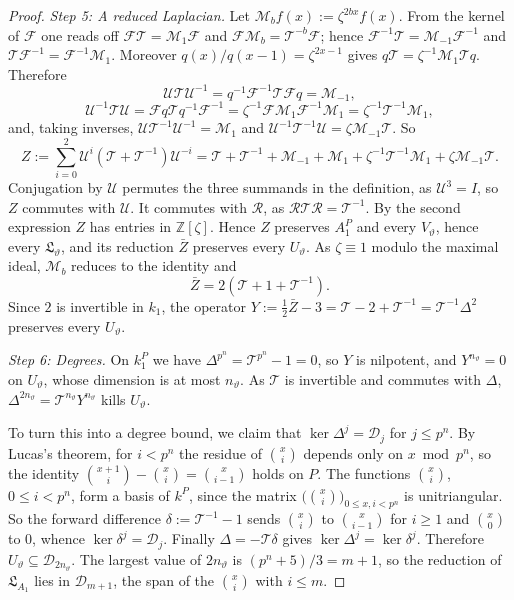 \documentclass[11pt]{amsart}
\numberwithin{equation}{section}
\theoremstyle{plain}
\theoremstyle{definition}
\theoremstyle{remark}
\begin{document}
\begin{proof}
\emph{Step 5: A reduced Laplacian.} Let \(\mathcal M_bf(x):=\zeta^{2bx}f(x)\). From the kernel of \(\mathcal F\) one reads off \(\mathcal F\mathcal T=\mathcal M_1\mathcal F\) and \(\mathcal F\mathcal M_b=\mathcal T^{-b}\mathcal F\); hence \(\mathcal F^{-1}\mathcal T=\mathcal M_{-1}\mathcal F^{-1}\) and \(\mathcal T\mathcal F^{-1}=\mathcal F^{-1}\mathcal M_1\). Moreover \(q(x)/q(x-1)=\zeta^{2x-1}\) gives \(q\mathcal T=\zeta^{-1}\mathcal M_1\mathcal Tq\). Therefore
\[\mathcal U\mathcal T\mathcal U^{-1}=q^{-1}\mathcal F^{-1}\mathcal T\mathcal Fq=\mathcal M_{-1},\]
\[\mathcal U^{-1}\mathcal T\mathcal U=\mathcal Fq\mathcal Tq^{-1}\mathcal F^{-1}=\zeta^{-1}\mathcal F\mathcal M_1\mathcal F^{-1}\mathcal M_1=\zeta^{-1}\mathcal T^{-1}\mathcal M_1,\]
and, taking inverses, \(\mathcal U\mathcal T^{-1}\mathcal U^{-1}=\mathcal M_1\) and \(\mathcal U^{-1}\mathcal T^{-1}\mathcal U=\zeta\mathcal M_{-1}\mathcal T\). So
\[Z:=\sum_{i=0}^{2}\mathcal U^i(\mathcal T+\mathcal T^{-1})\mathcal U^{-i}=\mathcal T+\mathcal T^{-1}+\mathcal M_{-1}+\mathcal M_1+\zeta^{-1}\mathcal T^{-1}\mathcal M_1+\zeta\mathcal M_{-1}\mathcal T .\]
Conjugation by \(\mathcal U\) permutes the three summands in the definition, as \(\mathcal U^3=I\), so \(Z\) commutes with \(\mathcal U\). It commutes with \(\mathcal R\), as \(\mathcal R\mathcal T\mathcal R=\mathcal T^{-1}\). By the second expression \(Z\) has entries in \(\mathbb Z[\zeta]\). Hence \(Z\) preserves \(A_1^P\) and every \(V_\vartheta\), hence every \(\mathfrak L_\vartheta\), and its reduction \(\bar Z\) preserves every \(U_\vartheta\). As \(\zeta\equiv1\) modulo the maximal ideal, \(\mathcal M_b\) reduces to the identity and
\[\bar Z=2(\mathcal T+1+\mathcal T^{-1}).\]
Since \(2\) is invertible in \(k_1\), the operator \(Y:=\tfrac12\bar Z-3=\mathcal T-2+\mathcal T^{-1}=\mathcal T^{-1}\Delta^2\) preserves every \(U_\vartheta\).

\emph{Step 6: Degrees.} On \(k_1^P\) we have \(\Delta^{p^n}=\mathcal T^{p^n}-1=0\), so \(Y\) is nilpotent, and \(Y^{n_\vartheta}=0\) on \(U_\vartheta\), whose dimension is at most \(n_\vartheta\). As \(\mathcal T\) is invertible and commutes with \(\Delta\), \(\Delta^{2n_\vartheta}=\mathcal T^{n_\vartheta}Y^{n_\vartheta}\) kills \(U_\vartheta\).

To turn this into a degree bound, we claim that \(\ker\Delta^j=\mathcal D_j\) for \(j\le p^n\). By Lucas's theorem, for \(i<p^n\) the residue of \(\binom xi\) depends only on \(x\bmod p^n\), so the identity \(\binom{x+1}i-\binom xi=\binom x{i-1}\) holds on \(P\). The functions \(\binom xi\), \(0\le i<p^n\), form a basis of \(k^P\), since the matrix \(\bigl(\binom xi\bigr)_{0\le x,i<p^n}\) is unitriangular. So the forward difference \(\delta:=\mathcal T^{-1}-1\) sends \(\binom xi\) to \(\binom x{i-1}\) for \(i\ge1\) and \(\binom x0\) to \(0\), whence \(\ker\delta^j=\mathcal D_j\). Finally \(\Delta=-\mathcal T\delta\) gives \(\ker\Delta^j=\ker\delta^j\). Therefore \(U_\vartheta\subseteq\mathcal D_{2n_\vartheta}\). The largest value of \(2n_\vartheta\) is \((p^n+5)/3=m+1\), so the reduction of \(\mathfrak L_{A_1}\) lies in \(\mathcal D_{m+1}\), the span of the \(\binom xi\) with \(i\le m\).


\end{proof}
\end{document}
